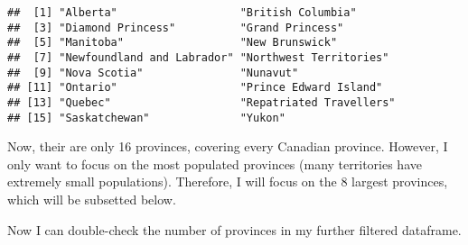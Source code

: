 \documentclass[]{tufte-handout}
\newenvironment{Shaded}{}{}
\newcommand{\CommentTok}[1]{\textcolor[rgb]{0.38,0.63,0.69}{\textit{#1}}}
\newcommand{\DataTypeTok}[1]{\textcolor[rgb]{0.56,0.13,0.00}{#1}}
\newcommand{\KeywordTok}[1]{\textcolor[rgb]{0.00,0.44,0.13}{\textbf{#1}}}
\newcommand{\NormalTok}[1]{#1}
\newcommand{\OperatorTok}[1]{\textcolor[rgb]{0.40,0.40,0.40}{#1}}
\newcommand{\StringTok}[1]{\textcolor[rgb]{0.25,0.44,0.63}{#1}}
\begin{document}
\begin{verbatim}
##  [1] "Alberta"                   "British Columbia"         
##  [3] "Diamond Princess"          "Grand Princess"           
##  [5] "Manitoba"                  "New Brunswick"            
##  [7] "Newfoundland and Labrador" "Northwest Territories"    
##  [9] "Nova Scotia"               "Nunavut"                  
## [11] "Ontario"                   "Prince Edward Island"     
## [13] "Quebec"                    "Repatriated Travellers"   
## [15] "Saskatchewan"              "Yukon"
\end{verbatim}

Now, their are only 16 provinces, covering every Canadian province.
However, I only want to focus on the most populated provinces (many
territories have extremely small populations). Therefore, I will focus
on the 8 largest provinces, which will be subsetted below.

\begin{Shaded}
\end{Shaded}

Now I can double-check the number of provinces in my further filtered
dataframe.

\begin{Shaded}
\end{Shaded}
\end{document}
